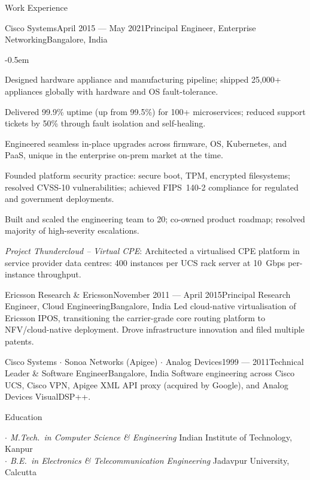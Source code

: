 \documentclass{resume}
\begin{document}
\begin{rSection}{Work Experience}
\begin{rSubsection}{Cisco Systems}{April 2015 --- May 2021}{Principal Engineer, Enterprise Networking}{Bangalore, India}
\begin{itemize}
\renewcommand\labelitemi{--}
{\small
\itemsep -0.5em
\item Designed hardware appliance and manufacturing pipeline; shipped 25,000+ appliances globally with hardware and OS fault-tolerance.
\item Delivered 99.9\% uptime (up from 99.5\%) for 100+ microservices; reduced support tickets by 50\% through fault isolation and self-healing.
\item Engineered seamless in-place upgrades across firmware, OS, Kubernetes, and PaaS, unique in the enterprise on-prem market at the time.
\item Founded platform security practice: secure boot, TPM, encrypted filesystems; resolved CVSS-10 vulnerabilities; achieved FIPS~140-2 compliance for regulated and government deployments.
\item Built and scaled the engineering team to 20; co-owned product roadmap; resolved majority of high-severity escalations.
}
\end{itemize}

\item {\em Project Thundercloud -- Virtual CPE}:
Architected a virtualised CPE platform in service provider data centres: 400 instances per UCS rack server at 10~Gbps per-instance throughput.

\end{rSubsection}

\begin{rSubsection}{Ericsson Research \& Ericsson}{November 2011 --- April 2015}{Principal Research Engineer, Cloud Engineering}{Bangalore, India}
{Led cloud-native virtualisation of Ericsson IPOS, transitioning the carrier-grade core routing platform to NFV/cloud-native deployment. Drove infrastructure innovation and filed multiple patents.}
\end{rSubsection}

\begin{rSubsection}{Cisco Systems $\cdot$ Sonoa Networks (Apigee) $\cdot$ Analog Devices}{1999 --- 2011}{Technical Leader \& Software Engineer}{Bangalore, India}
{Software engineering across Cisco UCS, Cisco VPN, Apigee XML API proxy (acquired by Google), and Analog Devices VisualDSP++.}
\end{rSubsection}

\end{rSection}


\begin{rSection}{Education}

{\em $\cdot$ M.Tech.\ in Computer Science \& Engineering} \hfill Indian Institute of Technology, Kanpur \\
{\em $\cdot$ B.E.\ in Electronics \& Telecommunication Engineering} \hfill Jadavpur University, Calcutta

\end{rSection}
\end{document}
